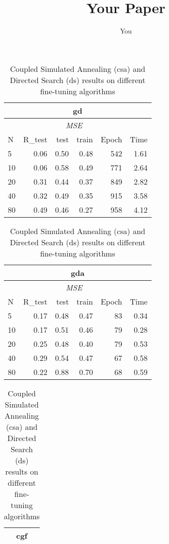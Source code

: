 \documentclass[a4paper, 10pt]{article}
\title{Your Paper}
\author{You}
\begin{document}
\maketitle
\begin{table}[h!]
    \caption{Coupled Simulated Annealing (csa) and Directed Search (ds)
      results on different fine-tuning algorithms}
    \label{tab:finetuning}
    \begin{tabular}{@{}lrrrrr@{}}
      \multicolumn{6}{c}{\textbf{gd}} \\
      \toprule
      &  & \multicolumn{2}{c}{\emph{MSE}} & & \\
      N  &   R_{test}  &  test & train  &  Epoch  & Time \\
      \midrule
       5       &   0.06     &   0.50      &  0.48       &  542     & 1.61   \\
      10       &   0.06     &   0.58      &  0.49       &  771     & 2.64   \\
      20       &   0.31     &   0.44      &  0.37       &  849     & 2.82   \\
      40       &   0.32     &   0.49      &  0.35       &  915     & 3.58   \\
      80       &   0.49     &   0.46      &  0.27       &  958     & 4.12   \\
      \bottomrule
    \end{tabular} 
    \hfill
    \begin{tabular}{@{}lrrrrr@{}}
      \multicolumn{6}{c}{\textbf{gda}} \\
      \toprule
      &  & \multicolumn{2}{c}{\emph{MSE}} & & \\
      N  &   R_{test}  &  test & train  &  Epoch  & Time \\
      \midrule
       5  & 0.17    & 0.48    & 0.47    & 83      &  0.34   \\
      10  & 0.17    & 0.51    & 0.46    & 79      &  0.28   \\
      20  & 0.25    & 0.48    & 0.40    & 79      &  0.53   \\
      40  & 0.29    & 0.54    & 0.47    & 67      &  0.58   \\
      80  & 0.22    & 0.88    & 0.70    & 68      &  0.59   \\                 
      \bottomrule
    \end{tabular} 
    \hfill
    \begin{tabular}{@{}lrrrrr@{}}
      \multicolumn{6}{c}{\textbf{cgf}} \\
      \toprule

\end{tabular}
\end{table}
\end{document}
